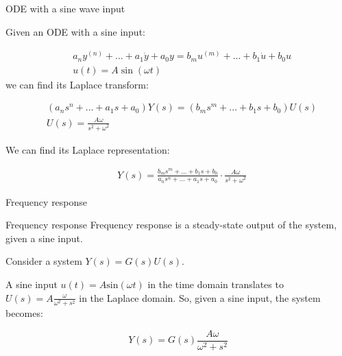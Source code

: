 \documentclass{beamer}
\begin{document}
\begin{frame}{ODE with a sine wave input}
	\begin{flushleft}
		
		Given an ODE with a sine input:
		
		\begin{align}
			&a_n y^{(n)} + ... + a_1 \dot y  + a_0 y = b_m u^{(m )}+ ... + b_1 \dot u + b_0 u
			\\
			&u(t) = A \sin (\omega t) 
		\end{align}
		we can find its Laplace transform:
		
		\begin{align}
			&(a_n s^n + ... + a_1 s  + a_0) Y(s) = (b_m s^m + ... + b_1 s  + b_0) U(s)
			\\
			&U(s) = \frac{A \omega }{s^2 + \omega^2} 
		\end{align}
		
		We can find its Laplace representation:
		
		\begin{align}
			&Y(s) = \frac{b_m s^m + ... + b_1 s  + b_0}{a_n s^n + ... + a_1 s  + a_0} \cdot \frac{A \omega}{s^2 + \omega^2} 
		\end{align}
		
		
	\end{flushleft}
\end{frame}




\begin{frame}{Frequency response}
	\begin{flushleft}
		
		\begin{block}{Frequency response}
			Frequency response is a steady-state output of the system, given a sine input.
		\end{block}
	
		\bigskip
	
		Consider a system $Y(s) = G(s)U(s)$. 
		
		A sine input $u(t) = A \text{sin}(\omega t)$ in the time domain translates to $U(s) = A \frac{\omega}{\omega^2 + s^2}$ in the Laplace domain. So, given a sine input, the system becomes:
		
		\begin{equation}
			Y(s) = G(s)\frac{A \omega}{\omega^2 + s^2}
		\end{equation}
		
	\end{flushleft}
\end{frame}
\end{document}
